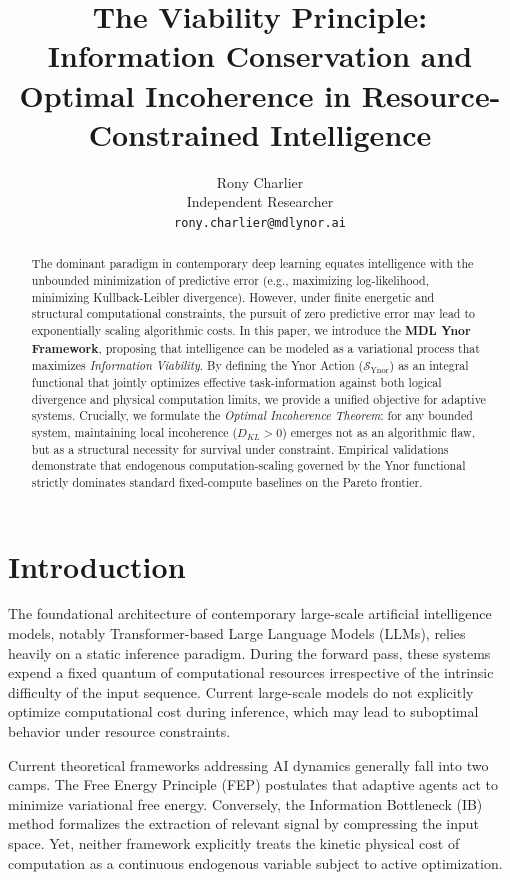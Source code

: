 \documentclass{article}
\title{The Viability Principle: Information Conservation and Optimal Incoherence in Resource-Constrained Intelligence}
\author{%
 Rony Charlier \\
 Independent Researcher \\
 \texttt{rony.charlier@mdlynor.ai} \\
}
\begin{document}
\maketitle

\begin{abstract}
The dominant paradigm in contemporary deep learning equates intelligence with the unbounded minimization of predictive error (e.g., maximizing log-likelihood, minimizing Kullback-Leibler divergence). However, under finite energetic and structural computational constraints, the pursuit of zero predictive error may lead to exponentially scaling algorithmic costs. In this paper, we introduce the \textbf{MDL Ynor Framework}, proposing that intelligence can be modeled as a variational process that maximizes \textit{Information Viability}. By defining the Ynor Action ($\mathcal{S}_{\text{Ynor}}$) as an integral functional that jointly optimizes effective task-information against both logical divergence and physical computation limits, we provide a unified objective for adaptive systems. Crucially, we formulate the \textit{Optimal Incoherence Theorem}: for any bounded system, maintaining local incoherence ($D_{KL} > 0$) emerges not as an algorithmic flaw, but as a structural necessity for survival under constraint. Empirical validations demonstrate that endogenous computation-scaling governed by the Ynor functional strictly dominates standard fixed-compute baselines on the Pareto frontier.
\end{abstract}

\section{Introduction}

The foundational architecture of contemporary large-scale artificial intelligence models, notably Transformer-based Large Language Models (LLMs), relies heavily on a static inference paradigm. During the forward pass, these systems expend a fixed quantum of computational resources irrespective of the intrinsic difficulty of the input sequence. Current large-scale models do not explicitly optimize computational cost during inference, which may lead to suboptimal behavior under resource constraints.

Current theoretical frameworks addressing AI dynamics generally fall into two camps. The Free Energy Principle (FEP) \cite{friston2010} postulates that adaptive agents act to minimize variational free energy. Conversely, the Information Bottleneck (IB) method \cite{tishby1999} formalizes the extraction of relevant signal by compressing the input space. Yet, neither framework explicitly treats the kinetic physical cost of computation as a continuous endogenous variable subject to active optimization.
\end{document}
